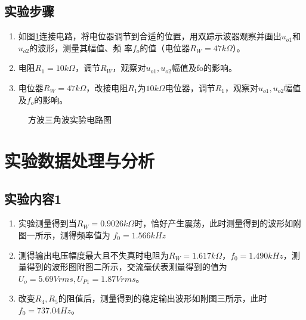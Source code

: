 \documentclass[a4paper,11pt,UTF8]{ctexart}
\begin{document}
\subsection{实验步骤}
\begin{enumerate}
  \item 如图\ref{fig:STWave}连接电路，将电位器调节到合适的位置，用双踪示波器观察并画出$u_{o1}$和$u_{o2}$的波形，测量其幅值、频
  率$f_o$的值（电位器$R_W=47kΩ$）。
  \item 电阻$R_1=10kΩ$，调节$R_W$，观察对$u_{o1},u_{o2}$幅值及fo的影响。
  \item 电位器$R_W=47kΩ$，改接电阻$R_1$为$10kΩ$电位器，调节$R_1$，观察对$u_{o1},u_{o2}$幅值及$f_o$的影响。
\end{enumerate}
\begin{figure}[htbp]
  \centering
  \caption{方波三角波实验电路图}
  \label{fig:STWave}
  \end{figure}

\section{实验数据处理与分析}
\subsection{实验内容1}
\begin{enumerate}
  \item 实验测量得到当$R_W=0.9026k\Omega$时，恰好产生震荡，此时测量得到的波形如附图一所示，测得频率值为
  $f_0=1.566kHz$
  \item 测得输出电压幅度最大且不失真时电阻为$R_W=1.617k\Omega$，$f_0=1.490kHz$，测量得到的波形图附图二所示，交流毫伏表测量得到的值为$U_{o}=5.69Vrms,U_{P1}=1.87Vrms$。
  \item 改变$R_4,R_5$的阻值后，测量得到的稳定输出波形如附图三所示，此时$f_0=737.04Hz$。
\end{enumerate}
\end{document}

